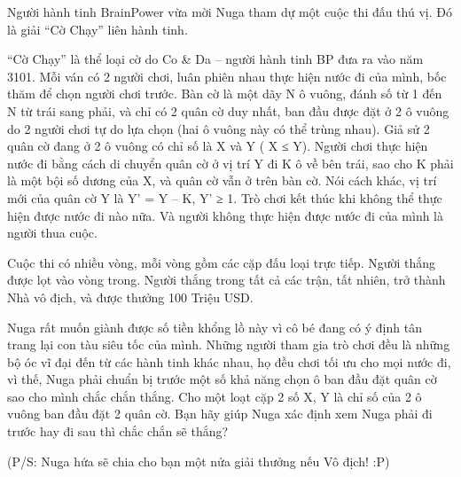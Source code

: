 Người hành tinh BrainPower vừa mời Nuga tham dự một cuộc thi đấu thú vị. Đó là giải “Cờ Chạy” liên hành tinh.  

   “Cờ Chạy” là thể loại cờ do Co \& Da – người hành tinh BP đưa ra vào năm 3101. Mỗi ván có 2 người chơi, luân phiên nhau thực hiện nước đi của mình, bốc thăm để chọn người chơi trước. Bàn cờ là một dãy N ô vuông, đánh số từ 1 đến N từ trái sang phải, và chỉ có 2 quân cờ duy nhất, ban đầu được đặt ở 2 ô vuông do 2 người chơi tự do lựa chọn (hai ô vuông này có thể trùng nhau). Giả sử 2 quân cờ đang ở 2 ô vuông có chỉ số là X và Y ( X ≤ Y). Người chơi thực hiện nước đi bằng cách di chuyển quân cờ ở vị trí Y đi K ô về bên trái, sao cho K phải là một bội số dương của X, và quân cờ vẫn ở trên bàn cờ. Nói cách khác, vị trí mới của quân cờ Y là Y’ = Y – K, Y’ ≥ 1. Trò chơi kết thúc khi không thể thực hiện được nước đi nào nữa. Và người không thực hiện được nước đi của mình là người thua cuộc.  

   Cuộc thi có nhiều vòng, mỗi vòng gồm các cặp đấu loại trực tiếp. Người thắng được lọt vào vòng trong. Người thắng trong tất cả các trận, tất nhiên, trở thành Nhà vô địch, và được thưởng 100 Triệu USD.  

   Nuga rất muốn giành được số tiền khổng lồ này vì cô bé đang có ý định tân trang lại con tàu siêu tốc của mình.  Những người tham gia trò chơi đều là những bộ óc vĩ đại đến từ các hành tinh khác nhau, họ đều chơi tối ưu cho mọi nước đi, vì thế, Nuga phải chuẩn bị trước một số khả năng chọn ô ban đầu đặt quân cờ sao cho mình chắc chắn thắng. Cho một loạt cặp 2 số X, Y là chỉ số của 2 ô vuông ban đầu đặt 2 quân cờ. Bạn hãy giúp Nuga xác định xem Nuga phải đi trước hay đi sau thì chắc chắn sẽ thắng?  

   (P/S: Nuga hứa sẽ chia cho bạn một nửa giải thưởng nếu Vô địch! :P)